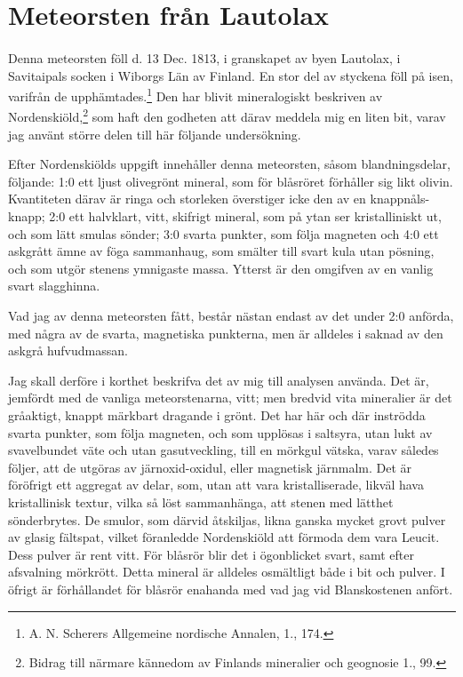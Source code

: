 \documentclass[a4paper, 12pt, oneside, swedish]{article}
\begin{document}
\section{Meteorsten från Lautolax}
\paragraph{}
Denna meteorsten föll d. 13 Dec. 1813, i granskapet av byen Lautolax, i Savitaipals socken i Wiborgs Län av Finland. En stor del av styckena föll på isen, varifrån de upphämtades.\footnote{A. N. Scherers Allgemeine nordische Annalen, 1., 174.} Den har blivit mineralogiskt beskriven av Nordenskiöld,\footnote{Bidrag till närmare kännedom av Finlands mineralier och geognosie 1., 99.} som haft den godheten att därav meddela mig en liten bit, varav jag använt större delen till här följande undersökning.

Efter Nordenskiölds uppgift innehåller denna meteorsten, såsom blandningsdelar, följande: 1:0 ett ljust olivegrönt mineral, som för blåsröret förhåller sig likt olivin. Kvantiteten därav är ringa och storleken överstiger icke den av en knappnåls-knapp; 2:0 ett halvklart, vitt, skifrigt mineral, som på ytan ser kristalliniskt ut, och som lätt smulas sönder; 3:0 svarta punkter, som följa magneten och 4:0 ett askgrått ämne av föga sammanhaug, som smälter till svart kula utan pösning, och som utgör stenens ymnigaste massa. Ytterst är den omgifven av en vanlig svart slagghinna.

Vad jag av denna meteorsten fått, består nästan endast av det under 2:0 anförda, med några av de svarta, magnetiska punkterna, men är alldeles i saknad av den askgrå hufvudmassan.

Jag skall derföre i korthet beskrifva det av mig till analysen använda. Det är, jemfördt med de vanliga meteorstenarna, vitt; men bredvid vita mineralier är det gråaktigt, knappt märkbart dragande i grönt. Det har här och där inströdda svarta punkter, som följa magneten, och som upplösas i saltsyra, utan lukt av svavelbundet väte och utan gasutveckling, till en mörkgul vätska, varav således följer, att de utgöras av järnoxid-oxidul, eller magnetisk järnmalm. Det är föröfrigt ett aggregat av delar, som, utan att vara kristalliserade, likväl hava kristallinisk textur, vilka så löst sammanhänga, att stenen med lätthet sönderbrytes. De smulor, som därvid åtskiljas, likna ganska mycket grovt pulver av glasig fältspat, vilket föranledde Nordenskiöld att förmoda dem vara Leucit. Dess pulver är rent vitt. För blåsrör blir det i ögonblicket svart, samt efter afsvalning mörkrött. Detta mineral är alldeles osmältligt både i bit och pulver. I öfrigt är förhållandet för blåsrör enahanda med vad jag vid Blanskostenen anfört.
\end{document}
